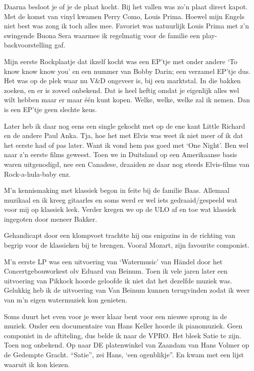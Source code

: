 \documentclass[10pt,twoside,openright]{memoir}
\begin{document}
Daarna besloot je of je de plaat kocht. Bij het vallen was zo’n plaat direct kapot. Met de komst van vinyl kwamen Perry Como, Louis Prima. Hoewel mijn Engels niet best was zong ik toch alles mee. Favoriet was natuurlijk Louis Prima met z’n swingende Buona Sera waarmee ik regelmatig voor de familie een play-backvoorstelling gaf.

Mijn eerste Rockplaatje dat ikzelf kocht was een EP'tje met onder andere `To know know know you' en een nummer van Bobby Darin; een verzamel EP'tje dus. Het was op de plek waar nu V\&D ongeveer is, bij een marktstal. In die bakken zoeken, en er is zoveel onbekend. Dat is heel heftig omdat je eigenlijk alles wel wilt hebben maar er maar één kunt kopen. Welke, welke, welke zal ik nemen. Dan is een EP'tje geen slechte keus.

Later heb ik daar nog eens een single gekocht met op de ene kant Little Richard en de andere Paul Anka. Tja, hoe het met Elvis was weet ik niet meer of ik dat het eerste had of pas later. Want ik vond hem pas goed met `One Night'. Ben wel naar z'n eerste films geweest. Toen we in Duitsland op een Amerikaanse basis waren uitgenodigd, nee een Canadese, draaiden ze daar nog steeds Elvis-films van Rock-a-hula-baby enz.

M’n kennismaking met klassiek begon in feite bij de familie Baas. Allemaal muzikaal en ik kreeg gitaarles en soms werd er wel iets gedraaid/gespeeld wat voor mij op klassiek leek. Verder kregen we op de ULO af en toe wat klassiek ingegoten door meneer Bakker. 

Gehandicapt door een klompvoet trachtte hij ons enigszins in de richting van begrip voor de klassieken bij te brengen. Vooral Mozart, zijn favourite componist.

M’n eerste LP was een uitvoering van ‘Watermusic’ van Händel door het Concertgebouworkest olv Eduard van Beinum. Toen ik vele jaren later een uitvoering van Pikkock hoorde geloofde ik niet dat het dezelfde muziek was. Gelukkig heb ik de uitvoering van Van Beinum kunnen terugvinden zodat ik weer van m’n eigen watermuziek kon genieten. 

Soms duurt het even voor je weer klaar bent voor een nieuwe sprong in de muziek. Onder een documentaire van Hans Keller hoorde ik pianomuziek. Geen componist in de aftiteling, dus belde ik naar de VPRO. Het bleek Satie te zijn. Toen nog onbekend. Op naar DE platenwinkel van Zaandam van Hans Volmer op de Gedempte Gracht. “Satie”, zei Hans, ‘een ogenblikje”. En kwam met een lijst waaruit ik kon kiezen. 
\end{document}
